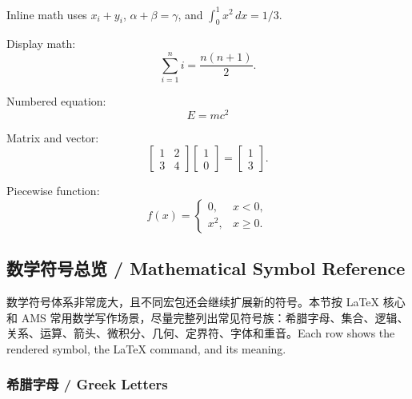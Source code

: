 \documentclass[11pt]{article}
\begin{document}
Inline math uses \(x_i + y_i\), \(\alpha + \beta = \gamma\), and
\(\int_0^1 x^2\,dx = 1/3\).

Display math:
\[
  \sum_{i=1}^{n} i = \frac{n(n+1)}{2}.
\]

Numbered equation:
\begin{equation}
  E = mc^2
\end{equation}

Matrix and vector:
\[
  \begin{bmatrix}
    1 & 2 \\
    3 & 4
  \end{bmatrix}
  \begin{bmatrix}
    1 \\
    0
  \end{bmatrix}
  =
  \begin{bmatrix}
    1 \\
    3
  \end{bmatrix}.
\]

Piecewise function:
\[
f(x)=
\begin{cases}
0, & x < 0,\\
x^2, & x \geq 0.
\end{cases}
\]

\subsection{数学符号总览 / Mathematical Symbol Reference}

数学符号体系非常庞大，且不同宏包还会继续扩展新的符号。本节按 LaTeX 核心和
AMS 常用数学写作场景，尽量完整列出常见符号族：希腊字母、集合、逻辑、
关系、运算、箭头、微积分、几何、定界符、字体和重音。Each row shows the
rendered symbol, the LaTeX command, and its meaning.

\subsubsection{希腊字母 / Greek Letters}
\end{document}
